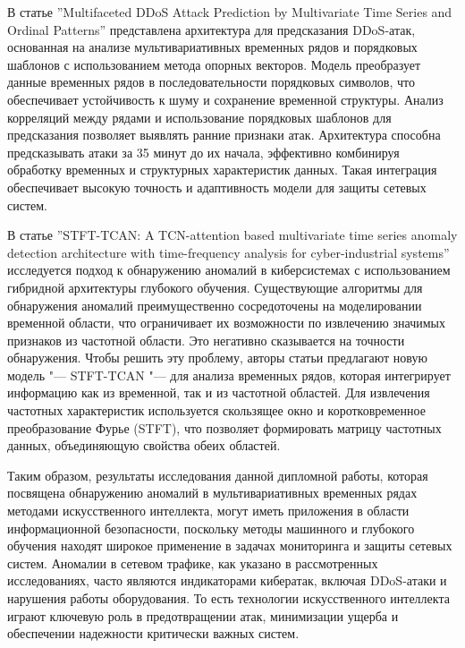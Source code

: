 \documentclass[spec, och, diploma]{SCWorks}
\begin{document}
        В статье ''Multifaceted DDoS Attack Prediction by Multivariate Time
        Series and Ordinal Patterns'' представлена архитектура для предсказания
        DDoS-атак, основанная на анализе мультивариативных временных рядов и
        порядковых шаблонов с использованием метода опорных векторов.
        \cite{ddos} Модель преобразует данные временных рядов в
        последовательности порядковых символов, что обеспечивает устойчивость к
        шуму и сохранение временной структуры. Анализ корреляций между рядами и
        использование порядковых шаблонов для предсказания позволяет выявлять
        ранние признаки атак. Архитектура способна предсказывать атаки за 35
        минут до их начала, эффективно комбинируя обработку временных и
        структурных характеристик данных. Такая интеграция обеспечивает высокую
        точность и адаптивность модели для защиты сетевых систем.

        В статье ''STFT-TCAN: A TCN-attention based multivariate time series
        anomaly detection architecture with time-frequency analysis for
        cyber-industrial systems'' исследуется подход к обнаружению аномалий в
        киберсистемах с использованием гибридной архитектуры глубокого обучения.
        \cite{stfttcan} Существующие алгоритмы для обнаружения аномалий
        преимущественно сосредоточены на моделировании временной области, что
        ограничивает их возможности по извлечению значимых признаков из
        частотной области. Это негативно сказывается на точности обнаружения.
        Чтобы решить эту проблему, авторы статьи предлагают новую модель "---
        STFT-TCAN "--- для анализа временных рядов, которая интегрирует
        информацию как из временной, так и из частотной областей. Для извлечения
        частотных характеристик используется скользящее окно и коротковременное
        преобразование Фурье (STFT), что позволяет формировать матрицу частотных
        данных, объединяющую свойства обеих областей.

        Таким образом, результаты исследования данной дипломной работы, которая
        посвящена обнаружению аномалий в мультивариативных временных рядах
        методами искусственного интеллекта, могут иметь приложения в области
        информационной безопасности, поскольку методы машинного и глубокого
        обучения находят широкое применение в задачах мониторинга и защиты
        сетевых систем. Аномалии в сетевом трафике, как указано в рассмотренных
        исследованиях, часто являются индикаторами кибератак, включая DDoS-атаки
        и нарушения работы оборудования. То есть технологии искусственного
        интеллекта играют ключевую роль в предотвращении атак, минимизации
        ущерба и обеспечении надежности критически важных систем.
\end{document}
